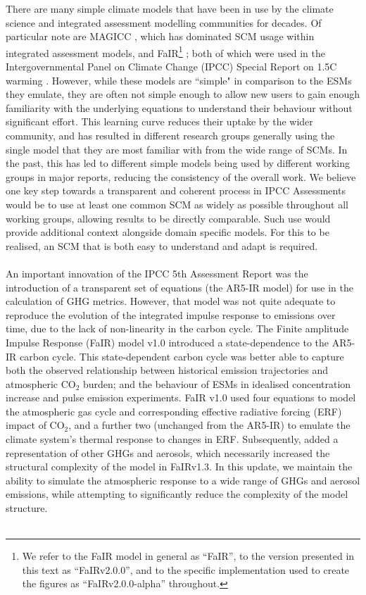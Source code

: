 \documentclass[gmd, manuscript]{copernicus}
\begin{document}
%
There are many simple climate models \citep{Nicholls2019} that have been in use by the climate science and integrated assessment modelling communities for decades. Of particular note are MAGICC \citep{Meinshausen2011}, which has dominated SCM usage within integrated assessment models, and FaIR\footnote{We refer to the FaIR model in general as ``FaIR'', to the version presented in this text as ``FaIRv2.0.0'', and to the specific implementation used to create the figures as ``FaIRv2.0.0-alpha'' throughout.} \citep{Smith2018}; both of which were used in the Intergovernmental Panel on Climate Change (IPCC) Special Report on 1.5\textdegree C warming \citep[SR15]{IPCC2018}. However, while these models are ``simple" in comparison to the ESMs they emulate, they are often not simple enough to allow new users to gain enough familiarity with the underlying equations to understand their behaviour without significant effort. This learning curve reduces their uptake by the wider community, and has resulted in different research groups generally using the single model that they are most familiar with \citep{Nicholls2019} from the wide range of SCMs. In the past, this has led to different simple models being used by different working groups in major reports, reducing the consistency of the overall work. We believe one key step towards a transparent and coherent process in IPCC Assessments would be to use at least one common SCM as widely as possible throughout all working groups, allowing results to be directly comparable. Such use would provide additional context alongside domain specific models. For this to be realised, an SCM that is both easy to understand and adapt is required.\\\\
%
An important innovation of the IPCC 5th Assessment Report \citep{Myhre2013a} was the introduction of a transparent set of equations (the AR5-IR model) for use in the calculation of GHG metrics. However, that model was not quite adequate to reproduce the evolution of the integrated impulse response to emissions over time, due to the lack of non-linearity in the carbon cycle. The Finite amplitude Impulse Response (FaIR) model v1.0 \citep{Millar2016} introduced a state-dependence to the AR5-IR carbon cycle. This state-dependent carbon cycle was better able to capture both the observed relationship between historical emission trajectories and atmospheric CO$_2$ burden; and the behaviour of ESMs in idealised concentration increase and pulse emission experiments. FaIR v1.0 used four equations to model the atmospheric gas cycle and corresponding effective radiative forcing (ERF) impact of CO$_2$, and a further two (unchanged from the AR5-IR) to emulate the climate system's thermal response to changes in ERF. Subsequently, \cite{Smith2018} added a representation of other GHGs and aerosols, which necessarily increased the structural complexity of the model in FaIRv1.3. In this update, we maintain the ability to simulate the atmospheric response to a wide range of GHGs and aerosol emissions, while attempting to significantly reduce the complexity of the model structure. \\\\
\end{document}
